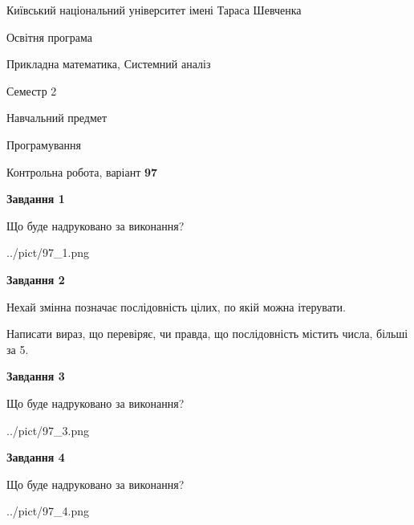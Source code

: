 \documentclass[12pt, ukrainian]{article}
\begin{document}
{{\begin {small}\par
{ \center  Київський національний університет імені Тараса Шевченка \par}
{\parbox {5 cm}{Освітня програма \hfill}{\parbox {8 cm}{Прикладна математика, Системний аналіз \hfill}}\parbox {5 cm}{\hfill Семестр 2}}\par
{\parbox {5 cm} {Навчальний предмет \hfill}\parbox {7 cm}{Програмування \hfill}\parbox {6cm}{\hfill}\par}\vspace{-7pt} \end{small}}{\center Контрольна робота, варіант  \No \textbf
{ 97 }\par}}
{
\begin {large}
{\begin {center}\textbf{Завдання 1}\end {center}}\par
Що буде надруковано за виконання?\par\par
\begin{center}
	{../pict/97_1.png}
\end{center}
\newpage

{\begin {center}\textbf{Завдання 2}\end {center}}\par
Нехай змінна  позначає послідовність цілих, по якій можна ітерувати.

Написати вираз, що перевіряє, чи правда, що послідовність  містить числа, більші за 5.\par
\newpage

{\begin {center}\textbf{Завдання 3}\end {center}}\par
Що буде надруковано за виконання?\par
\begin{center}
	{../pict/97_3.png}
\end{center}
\newpage

{\begin {center}\textbf{Завдання 4}\end {center}}\par
Що буде надруковано за виконання?\par
\begin{center}
	{../pict/97_4.png}
\end{center}
\newpage


\end{large}}
\end{document}
